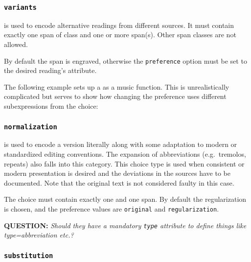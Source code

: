 \documentclass[]{ollmanual}
\newenvironment{Shaded}{}{}
\begin{document}
\hypertarget{variants}{%
\subsubsection{\texorpdfstring{\texttt{variants}}{variants}}\label{variants}}

 is used to encode alternative readings from
different sources. It must contain exactly one span of class
 and one or more  span(s). Other span
classes are not allowed.

By default the  span is engraved, otherwise the
\texttt{preference} option must be set to the desired reading's
 attribute.

The following example sets up a  as a music function. This
is unrealistically complicated but serves to show how changing the
preference uses different subexpressions from the choice:

\begin{Shaded}
\begin{Highlighting}[]

\end{Highlighting}
\end{Shaded}


\hypertarget{normalization}{%
\subsubsection{\texorpdfstring{\texttt{normalization}}{normalization}}\label{normalization}}

 is used to encode a version literally along
with some adaptation to modern or standardized editing conventions. The
expansion of abbreviations (e.g.~tremolos, repeats) also falls into this
category. This choice type is used when consistent or modern
presentation is desired and the deviations in the sources have to be
documented. Note that the original text is not considered faulty in this
case.

The choice must contain exactly one  and one
 span. By default the regularization is chosen,
and the preference values are \texttt{original} and
\texttt{regularization}.

\textbf{QUESTION:} \emph{Should they have a mandatory \texttt{type}
attribute to define things like type=abbreviation etc.?}

\hypertarget{substitution}{%
\subsubsection{\texorpdfstring{\texttt{substitution}}{substitution}}\label{substitution}}
\end{document}
